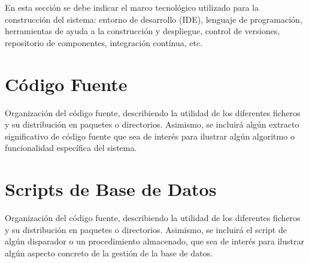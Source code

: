 En esta sección se debe indicar el marco tecnológico utilizado para la construcción del sistema: entorno de desarrollo (IDE), lenguaje de programación, herramientas de ayuda a la construcción y despliegue, control de versiones, repositorio de componentes, integración contí­nua, etc.



\section{Código Fuente}
Organización del código fuente, describiendo la utilidad de los diferentes ficheros y su distribución en paquetes o directorios. Asimismo, se incluirá algún extracto significativo de código fuente que sea de interés para ilustrar algún algoritmo o funcionalidad especí­fica del sistema.

\section{Scripts de Base de Datos}
Organización del código fuente, describiendo la utilidad de los diferentes ficheros y su distribución en paquetes o directorios. Asimismo, se incluirá el script de algún disparador o un procedimiento almacenado, que sea de interés para ilustrar algún aspecto concreto de la gestión de la base de datos.
